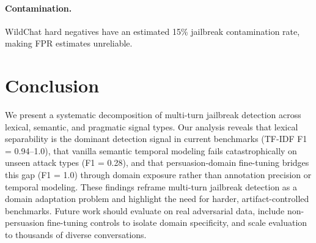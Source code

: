 \documentclass[11pt]{article}
\begin{document}
\paragraph{Contamination.}
WildChat hard negatives have an estimated 15\% jailbreak contamination rate, making FPR estimates unreliable.

\section{Conclusion}

We present a systematic decomposition of multi-turn jailbreak detection across lexical, semantic, and pragmatic signal types. Our analysis reveals that lexical separability is the dominant detection signal in current benchmarks (TF-IDF F1 = 0.94--1.0), that vanilla semantic temporal modeling fails catastrophically on unseen attack types (F1 = 0.28), and that persuasion-domain fine-tuning bridges this gap (F1 = 1.0) through domain exposure rather than annotation precision or temporal modeling. These findings reframe multi-turn jailbreak detection as a domain adaptation problem and highlight the need for harder, artifact-controlled benchmarks. Future work should evaluate on real adversarial data, include non-persuasion fine-tuning controls to isolate domain specificity, and scale evaluation to thousands of diverse conversations.


\end{document}
